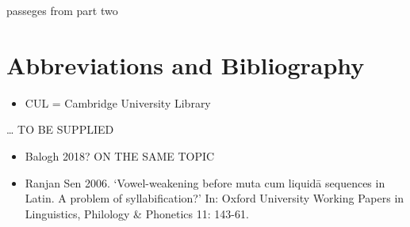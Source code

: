 \documentclass[11pt]{book}
\begin{document}
\thispagestyle{empty}
passeges from part two

\vfill
\pagebreak







\chapter*{Abbreviations and Bibliography}

\begin{itemize}

\item
  CUL = Cambridge University Library 
\end{itemize}

\ldots{} TO BE SUPPLIED

\begin{itemize}
\item
  Balogh 2018? ON THE SAME TOPIC
\item
  Ranjan Sen 2006. `Vowel-weakening before muta cum liquidā sequences in
  Latin. A problem of syllabification?' In: Oxford University Working
  Papers in Linguistics, Philology \& Phonetics 11: 143-61.
\end{itemize}




\vfill
\pagebreak

\noindent
\textsanskrit{\large 
}
\end{document}
